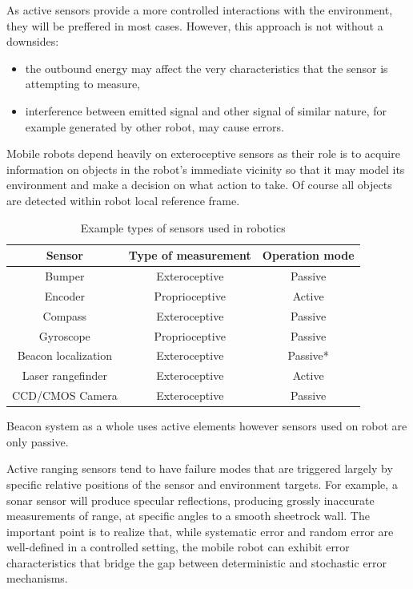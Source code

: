 As active sensors provide a  more controlled interactions with the environment, they  will be
preffered in most cases. However, this approach is not without a downsides:
\begin{itemize}
	\item the outbound energy may affect the very characteristics that the sensor is attempting
		to measure, 
	\item interference between emitted signal and other signal of similar nature, for 
		example generated by other robot, may cause errors.
\end{itemize}
Mobile robots depend heavily on exteroceptive sensors as their role is to acquire information on
objects in the robot’s immediate vicinity so that it may model its environment and make a 
decision on what action to take. Of course all objects are detected within robot local reference 
frame. 
\begin{table}[htb] 
	\centering
	\caption{Example types of sensors used in robotics}
	\label{tab:robot-sensors}
	\begin{tabular}{ccc}
		\hline
		\hline
		Sensor& Type of measurement& Operation mode\\
		\hline
		Bumper&  Exteroceptive& Passive\\
		Encoder& Proprioceptive& Active\\
		Compass& Exteroceptive& Passive\\
		Gyroscope& Proprioceptive& Passive\\
		Beacon localization& Exteroceptive& Passive*\\
		Laser rangefinder& Exteroceptive& Active\\
		CCD/CMOS Camera& Exteroceptive& Passive\\
		\hline
		\hline
	\end{tabular}
	\newline
	{\footnotesize *Beacon system as a whole uses active elements however sensors 
	used on robot are only passive.}
\end{table}
Active ranging sensors tend to have failure modes that are triggered largely by specific 
relative positions of the sensor and environment targets. For example, a sonar sensor will
produce specular reflections, producing grossly inaccurate measurements of range,
at specific angles to a smooth sheetrock wall.  The important point is to realize that, while 
systematic error and random error are well-defined in a controlled setting, the mobile robot can
exhibit error characteristics that bridge the gap between deterministic and stochastic error
mechanisms.

